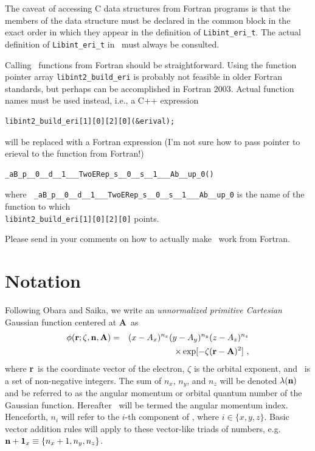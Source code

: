 \documentclass[10pt]{article}
\begin{document}
The caveat of accessing C data structures from Fortran programs is that the members of the data structure must be
declared in the common block in the exact order in which they appear in the definition of {\tt Libint\_eri\_t}.
The actual definition of {\tt Libint\_eri\_t} in \libinttypesh\ must always be consulted.

Calling \LIBINT\ functions from Fortran should be straightforward. Using the function pointer array {\tt libint2\_build\_eri} is probably
not feasible in older Fortran standards, but perhaps can be accomplished in Fortran 2003. Actual function names must be used instead, i.e.,
a C++ expression
\begin{verbatim}
libint2_build_eri[1][0][2][0](&erival);
\end{verbatim}
will be replaced with a Fortran expression (I'm not sure how to pass pointer to erieval to the function from Fortran!)
\begin{verbatim}
_aB_p__0__d__1___TwoERep_s__0__s__1___Ab__up_0()
\end{verbatim}
where {\tt
\_aB\_p\_\_0\_\_d\_\_1\_\_\_TwoERep\_s\_\_0\_\_s\_\_1\_\_\_Ab\_\_up\_0} is the
name of the function to which \\
{\tt libint2\_build\_eri[1][0][2][0]} points.

Please send in your comments on how to actually make \LIBINT\ work from Fortran.


\appendix
\appendixpage
\section{\label{sec:notation} Notation}

Following Obara and Saika,\cite{Obara86}
we write an {\em unnormalized primitive Cartesian} Gaussian function centered at {\bf A}\ as
\begin{eqnarray}
\phi ({\bf r}; \zeta, {\bf n}, {\bf A}) & = & (x - A_x)^{n_x} (y - A_y)^{n_y} (z - A_z)^{n_z} \nonumber \\
& & \times \exp [-\zeta({\bf r}-{\bf A})^2]\ ,
\end{eqnarray}
where {\bf r}\ is the coordinate vector of the electron, $\zeta$ is the orbital exponent, and
\n\ is a set of non-negative integers. The sum of $n_x$, $n_y$, and $n_z$ will be denoted $\lambda({\bf n})$
and be referred to as the angular momentum or orbital quantum number of the Gaussian function.
Hereafter \n\ will be termed the angular momentum index.
Henceforth, $n_i$ will refer to the $i$-th component of \n, where $i \in \{x, y, z\}$.
Basic vector addition rules will apply to these vector-like triads of numbers, e.g.
${\bf n} + {\bf 1}_x \equiv \{ n_x+1, n_y, n_z\}$.
\end{document}
